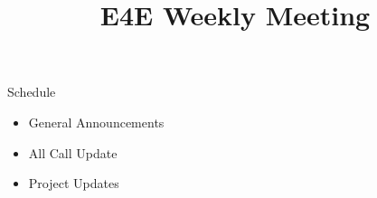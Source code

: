 \documentclass[aspectratio=169]{beamer}
\title{E4E Weekly Meeting}
\institute{UC San Diego}
\begin{document}
\maketitle
\begin{frame}{Schedule}
    \begin{itemize}
        \item General Announcements
        \item All Call Update
        \begin{enumerate}
            
        \end{enumerate}
        \item Project Updates
        \begin{enumerate}
            
        \end{enumerate}
    \end{itemize}
\end{frame}

\end{document}
